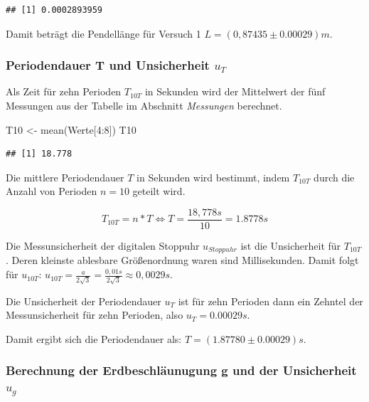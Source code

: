 \documentclass[
  9pt,
]{article}
\newenvironment{Shaded}{\begin{snugshade}}{\end{snugshade}}
\newcommand{\DecValTok}[1]{\textcolor[rgb]{0.00,0.00,0.81}{#1}}
\newcommand{\FunctionTok}[1]{\textcolor[rgb]{0.00,0.00,0.00}{#1}}
\newcommand{\NormalTok}[1]{#1}
\newcommand{\OtherTok}[1]{\textcolor[rgb]{0.56,0.35,0.01}{#1}}
\newcommand{\SpecialCharTok}[1]{\textcolor[rgb]{0.00,0.00,0.00}{#1}}
\begin{document}
\begin{verbatim}
## [1] 0.0002893959
\end{verbatim}

Damit beträgt die Pendellänge für Versuch 1
\(L = (0,87435 \pm 0.00029)m\).

\hypertarget{periodendauer-t-und-unsicherheit-u_t}{%
\subsubsection{\texorpdfstring{Periodendauer T und Unsicherheit
\(u_T\)}{Periodendauer T und Unsicherheit u\_T}}\label{periodendauer-t-und-unsicherheit-u_t}}

Als Zeit für zehn Perioden \(T_{10T}\) in Sekunden wird der Mittelwert
der fünf Messungen aus der Tabelle im Abschnitt \textit{Messungen}
berechnet.

\begin{Shaded}
\begin{Highlighting}[]
\NormalTok{T10 }\OtherTok{\textless{}{-}} \FunctionTok{mean}\NormalTok{(Werte[}\DecValTok{4}\SpecialCharTok{:}\DecValTok{8}\NormalTok{])}
\NormalTok{T10}
\end{Highlighting}
\end{Shaded}

\begin{verbatim}
## [1] 18.778
\end{verbatim}

Die mittlere Periodendauer \(T\) in Sekunden wird bestimmt, indem
\(T_{10T}\) durch die Anzahl von Perioden \(n=10\) geteilt wird.

\[T_{10T} = n*T \Leftrightarrow T = \frac{18,778s}{10}=1.8778s\]

Die Messunsicherheit der digitalen Stoppuhr \(u_{Stoppuhr}\) ist die
Unsicherheit für \(T_{10T}\). Deren kleinste ablesbare Größenordnung
waren sind Millisekunden. Damit folgt für \(u_{10T}\):
\(u_{10T}= \frac{a}{2\sqrt{3}} = \frac{0,01s}{2\sqrt{3}} \approx 0,0029s\).

Die Unsicherheit der Periodendauer \(u_T\) ist für zehn Perioden dann
ein Zehntel der Messunsicherheit für zehn Perioden, also
\(u_T=0.00029s\).

Damit ergibt sich die Periodendauer als: \(T=(1.87780 \pm 0.00029)s\).

\hypertarget{berechnung-der-erdbeschluxe4unugung-g-und-der-unsicherheit-u_g}{%
\subsubsection{\texorpdfstring{Berechnung der Erdbeschläunugung g und
der Unsicherheit
\(u_g\)}{Berechnung der Erdbeschläunugung g und der Unsicherheit u\_g}}\label{berechnung-der-erdbeschluxe4unugung-g-und-der-unsicherheit-u_g}}
\end{document}
